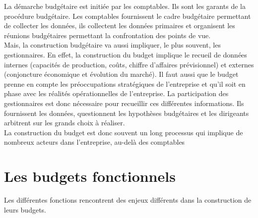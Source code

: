 \documentclass{kaobook}
\begin{document}
La démarche budgétaire est initiée par les comptables. Ils sont les garants de la procédure budgétaire. Les comptables fournissent le cadre budgétaire permettant de collecter les données, ils collectent les données primaires et organisent les réunions budgétaires permettant la confrontation des points de vue.\\
Mais, la construction budgétaire va aussi impliquer, le plus souvent, les gestionnaires. En effet, la construction du budget implique le recueil de données internes (capacités de production, coûts, chiffre d'affaires prévisionnel) et externes (conjoncture économique et évolution du marché). Il faut aussi que le budget prenne en compte les préoccupations stratégiques de l'entreprise et qu'il soit en phase avec les réalités opérationnelles de l'entreprise. La participation des gestionnaires est donc nécessaire pour recueillir ces différentes informations. Ils fournissent les données, questionnent les hypothèses budgétaires et les dirigeants arbitrent sur les grands choix à réaliser.\\
La construction du budget est donc souvent un long processus qui implique de nombreux acteurs dans l'entreprise, au-delà des comptables\\

\section{Les budgets fonctionnels}
\label{sec:orgf4feb86}
Les différentes fonctions rencontrent des enjeux différents dans la construction de leurs budgets.\\
\end{document}
